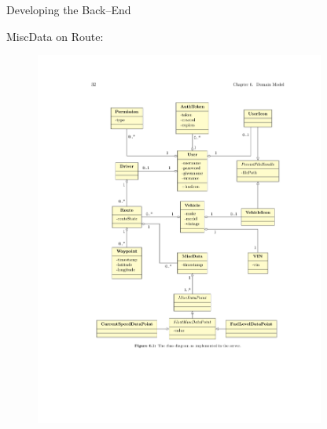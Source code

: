 \begin{frame}[t]{Developing the Back--End}
             {
            MiscData on Route:
            \begin{figure}[htb]
                \centering
                \includegraphics[width=0.85\textwidth, trim={4.2cm 6.0cm 2.5cm 11cm},clip]{class.pdf}
            \end{figure}
            }
        \end{frame}

